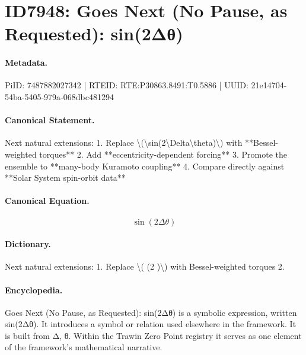 \section*{ID7948: Goes Next (No Pause, as Requested): sin(2Δθ)}
\paragraph{Metadata.}
PiID: 7487882027342 | RTEID: RTE:P30863.8491:T0.5886 | UUID: 21e14704-54ba-5405-979a-068dbc481294

\paragraph{Canonical Statement.}
Next natural extensions: 1. Replace \textbackslash{}(\textbackslash{}sin(2\textbackslash{}Delta\textbackslash{}theta)\textbackslash{}) with **Bessel-weighted torques** 2. Add **eccentricity-dependent forcing** 3. Promote the ensemble to **many-body Kuramoto coupling** 4. Compare directly against **Solar System spin-orbit data**

\paragraph{Canonical Equation.}
\[
\sin(2\Delta\theta)
\]

\paragraph{Dictionary.}
Next natural extensions: 1. Replace \textbackslash{}( (2 )\textbackslash{}) with Bessel-weighted torques 2.

\paragraph{Encyclopedia.}
Goes Next (No Pause, as Requested): sin(2Δθ) is a symbolic expression, written sin(2Δθ). It introduces a symbol or relation used elsewhere in the framework. It is built from Δ, θ. Within the Trawin Zero Point registry it serves as one element of the framework's mathematical narrative.
